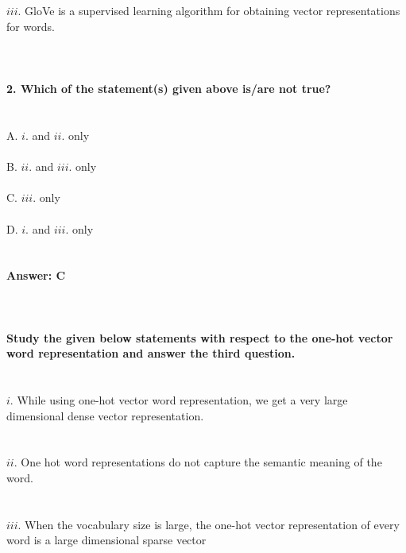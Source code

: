 \documentclass[prl,twocolumn,showpacs,preprintnumbers,superscriptaddress]{revtex4}
\theoremstyle{plain}
\theoremstyle{definition}
\begin{document}
\begin{widetext}
\\
\\
$iii.$ GloVe is a supervised learning algorithm for obtaining vector representations for words.
\\
\\
\\
\\
\textbf{2. Which of the statement(s) given above is/are not true?}
\\
\\
\\
A. $i.$ and $ii.$ only
\\
\\
B. $ii.$ and $iii.$ only
\\
\\
C. $iii.$ only
\\
\\
D. $i.$ and $iii.$ only
\\
\\
\\
\textbf{Answer: C}
\\
\\
\\
\\
\noindent\textbf{Study the given below statements with respect to the one-hot vector word representation and answer the third question.}
\\
\\
\\
$i.$ While using one-hot vector word representation, we get a very large dimensional dense vector representation.
\\
\\
\\
$ii.$ One hot word representations do not capture the semantic meaning of the word.
\\
\\
\\
$iii.$ When the vocabulary size is large, the one-hot vector representation of every word is a large dimensional sparse vector

\end{widetext}
\end{document}
